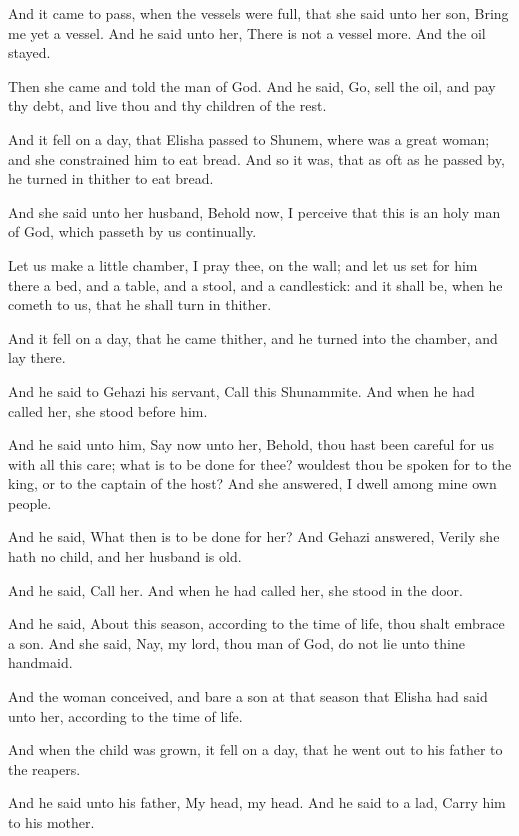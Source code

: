 \Verse And it came to pass, when the vessels were full, that she said unto her son, Bring me yet a vessel. And he said unto her, There is not a vessel more. And the oil stayed.

\Verse Then she came and told the man of God. And he said, Go, sell the oil, and pay thy debt, and live thou and thy children of the rest.

\Verse And it fell on a day, that Elisha passed to Shunem, where was a great woman; and she constrained him to eat bread. And so it was, that as oft as he passed by, he turned in thither to eat bread.

\Verse And she said unto her husband, Behold now, I perceive that this is an holy man of God, which passeth by us continually.

\Verse Let us make a little chamber, I pray thee, on the wall; and let us set for him there a bed, and a table, and a stool, and a candlestick: and it shall be, when he cometh to us, that he shall turn in thither.

\Verse And it fell on a day, that he came thither, and he turned into the chamber, and lay there.

\Verse And he said to Gehazi his servant, Call this Shunammite. And when he had called her, she stood before him.

\Verse And he said unto him, Say now unto her, Behold, thou hast been careful for us with all this care; what is to be done for thee?  wouldest thou be spoken for to the king, or to the captain of the host? And she answered, I dwell among mine own people.

\Verse And he said, What then is to be done for her? And Gehazi answered, Verily she hath no child, and her husband is old.

\Verse And he said, Call her. And when he had called her, she stood in the door.

\Verse And he said, About this season, according to the time of life, thou shalt embrace a son. And she said, Nay, my lord, thou man of God, do not lie unto thine handmaid.

\Verse And the woman conceived, and bare a son at that season that Elisha had said unto her, according to the time of life.

\Verse And when the child was grown, it fell on a day, that he went out to his father to the reapers.

\Verse And he said unto his father, My head, my head. And he said to a lad, Carry him to his mother.

